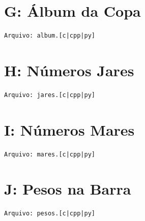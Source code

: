 \documentclass[12pt,oneside]{article} %
\begin{document}
\newpage
\section*{G: Álbum da Copa} %
\vspace{-0.52cm}
\noindent \begin{verbatim}Arquivo: album.[c|cpp|py]\end{verbatim}


\newpage
\section*{H: Números Jares} %
\vspace{-0.52cm}
\noindent \begin{verbatim}Arquivo: jares.[c|cpp|py]\end{verbatim}


\newpage
\section*{I: Números Mares} %
\vspace{-0.52cm}
\noindent \begin{verbatim}Arquivo: mares.[c|cpp|py]\end{verbatim}


\newpage
\section*{J: Pesos na Barra} %
\vspace{-0.52cm}
\noindent \begin{verbatim}Arquivo: pesos.[c|cpp|py]\end{verbatim}

\end{document}
